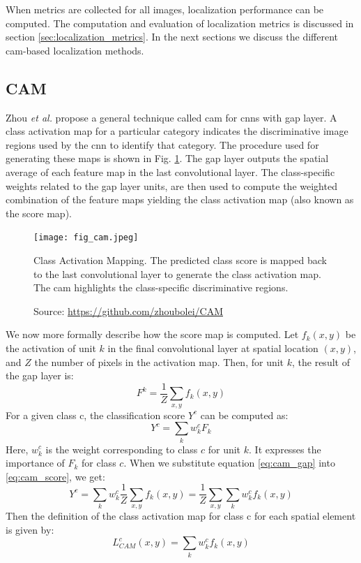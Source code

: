 When metrics are collected for all images, localization performance can be computed. The computation and evaluation of localization metrics is discussed in section \ref{sec:localization_metrics}. In the next sections we discuss the different \acrshort{cam}-based localization methods.

\subsection{CAM} \label{sec:cam}
Zhou \textit{et al.} propose a general technique called \acrfull{cam} for \acrshort{cnn}s with \acrshort{gap} layer. A class activation map for a particular category indicates the discriminative image regions used by the
\acrshort{cnn} to identify that category. The procedure used for generating these maps is shown in Fig. \ref{fig:cam}. The \acrshort{gap} layer outputs the spatial average of each feature map in the last convolutional layer. The class-specific weights related to the \acrshort{gap} layer units, are then used to compute the weighted combination of the feature maps yielding the class activation map (also known as the score map).

\begin{figure}[h]
    \begin{center}       
    \texttt{[image: fig\_cam.jpeg]}
    \caption[Class Activation Mapping]{Class Activation Mapping. The predicted class score is mapped back to the last convolutional layer to generate the class activation map. The \acrshort{cam} highlights the class-specific discriminative regions.}
    \caption*{Source: \href{https://github.com/zhoubolei/CAM}{https://github.com/zhoubolei/CAM}}
    \label{fig:cam}
    \end{center}
\end{figure}

We now more formally describe how the score map is computed. Let $f_{k}(x,y)$ be the activation of unit $k$ in the final convolutional layer at spatial location $(x,y)$, and $Z$ the number of pixels in the activation map. Then, for unit $k$, the result of the \acrshort{gap} layer is:
\begin{equation} \label{eq:cam_gap}
    F^{k} = \frac{1}{Z}\sum_{x,y}f_{k}(x,y)
\end{equation}
For a given class c, the classification score $Y^{c}$ can be computed as:
\begin{equation} \label{eq:cam_score}
    Y^{c} = \sum_{k}w_{k}^{c}F_{k}
\end{equation}
Here, $w_{k}^{c}$ is the weight corresponding to class $c$ for unit $k$. It expresses the importance of $F_{k}$ for class $c$.
When we substitute equation \ref{eq:cam_gap} into \ref{eq:cam_score}, we get:
\begin{equation} \label{eq:cam_score2}
    Y^{c} = \sum_{k}w_{k}^{c}\frac{1}{Z}\sum_{x,y}f_{k}(x,y) = \frac{1}{Z}\sum_{x,y}\sum_{k}w_{k}^{c}f_{k}(x,y)
\end{equation}
Then the definition of the class activation map for class c for each spatial element is given by:
\begin{equation} \label{eq:cam_map}
    L_{CAM}^{c}(x,y) = \sum_{k}w_{k}^{c}f_{k}(x,y)
\end{equation}

